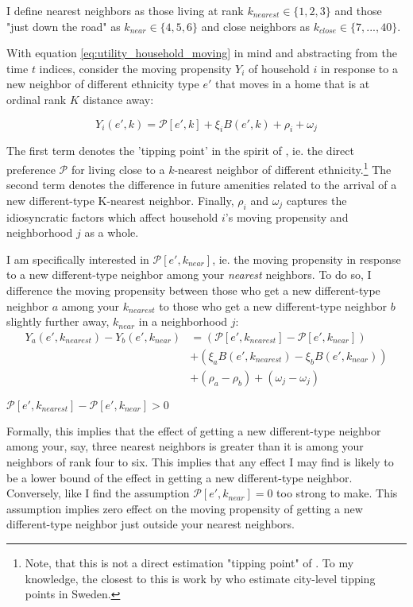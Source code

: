 \documentclass[../main.tex]{subfiles}
\begin{document}
I define nearest neighbors as those living at rank $k_{nearest}\in \{1, 2, 3\}$ and those "just down the road" as $k_{near} \in \{4,5,6\}$ and close neighbors as $k_{close} \in \{7, ...,40\}$.

With equation \ref{eq:utility_household_moving} in mind and abstracting from the time $t$ indices, consider the moving propensity $Y_i$ of household $i$ in response to a new neighbor of different ethnicity type $e'$ that moves in a home that is at ordinal rank $K$ distance away:

\begin{equation}
    Y_i(e', k) = \mathcal{P}[e', k] + \xi_i B(e', k) + \rho_i + \omega_j
\end{equation}

The first term denotes the 'tipping point' in the spirit of \textcite{schelling1971dynamic}, ie. the direct preference $\mathcal{P}$ for living close to a $k$-nearest neighbor of different ethnicity.\footnote{Note, that this is not a direct estimation "tipping point" of \textcite{schelling1971dynamic}. To my knowledge, the closest to this is work by \textcite{bohlmark_willen_2020_tipping} who estimate city-level tipping points in Sweden.}   The second term denotes the difference in future amenities related  to the arrival of a new different-type K-nearest neighbor. Finally, $\rho_i$ and $\omega_j$ captures the idiosyncratic factors which affect household $i$'s moving propensity and neighborhood $j$ as a whole. 

I am specifically interested in $\mathcal{P}[e', k_{near}]$, ie. the moving propensity in response to a new different-type neighbor among your \textit{nearest} neighbors. To do so, I difference the moving propensity between those who get a new different-type neighbor $a$ among your $k_{nearest}$ to those who get a new different-type neighbor $b$ slightly further away, $k_{near}$ in a neighborhood $j$:
\begin{equation}
\begin{split}
    Y_a(e', k_{nearest}) - Y_b(e', k_{near}) &=( \mathcal{P}[e', k_{nearest}] - \mathcal{P}[e', k_{near}]) \\
    &+ (\xi_a B(e', k_{nearest}) - \xi_b B(e', k_{near})) \\
    &+ (\rho_a - \rho_b)  + (\omega_j - \omega_j)
\end{split}
\label{eq:move_propensity_diff}
\end{equation}

\begin{assumption}
    \label{assump:proximity_assumption}
    $\mathcal{P}[e', k_{nearest}] - \mathcal{P}[e', k_{near}] > 0$
\end{assumption}
Formally, this implies that the effect of getting a new different-type neighbor among your, say, three nearest neighbors is greater than it is among your neighbors of rank four to six. This implies that any effect I may find is likely to be a lower bound of the effect in getting a new different-type neighbor. Conversely, like \textcite{Bayer_2022_nearest_neighbor} I find the assumption $\mathcal{P}[e', k_{near}] = 0$ too strong to make. This assumption implies zero effect on the moving propensity of getting a new different-type neighbor just outside your nearest neighbors. 
\end{document}
